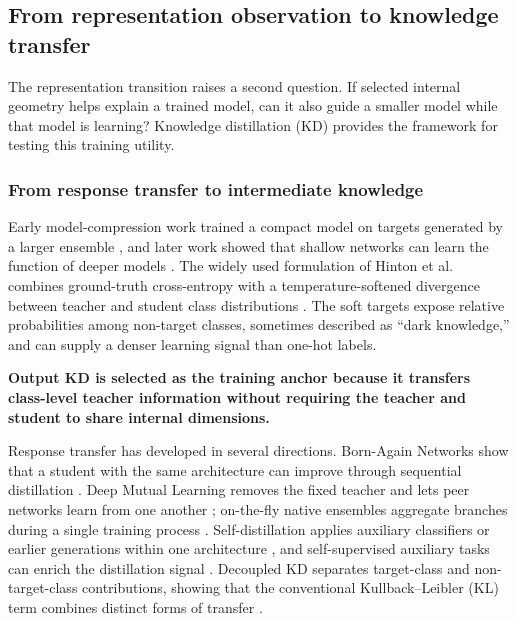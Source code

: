 \subsection{From representation observation to knowledge transfer}

The representation transition raises a second question. If selected internal
geometry helps explain a trained model, can it also guide a smaller model while
that model is learning? Knowledge distillation (KD) provides the framework for
testing this training utility.

\subsubsection{From response transfer to intermediate knowledge}

Early model-compression work trained a compact model on targets
generated by a larger ensemble \cite{bucila2006compression}, and later work
showed that shallow networks can learn the function of deeper models
\cite{ba2014deep}. The widely used formulation of Hinton et al. combines
ground-truth cross-entropy with a temperature-softened divergence between
teacher and student class distributions \cite{hinton2015distilling}. The soft
targets expose relative probabilities among non-target classes, sometimes
described as ``dark knowledge,'' and can supply a denser learning signal than
one-hot labels.

\textbf{Output KD is selected as the training anchor because it transfers
class-level teacher information without requiring the teacher and student to
share internal dimensions.}

Response transfer has developed in several directions. Born-Again Networks
show that a student with the same architecture can improve through sequential
distillation \cite{furlanello2018ban}. Deep Mutual Learning removes the fixed
teacher and lets peer networks learn from one another
\cite{zhang2018dml}; on-the-fly native ensembles aggregate branches during a
single training process \cite{lan2018one}. Self-distillation applies auxiliary
classifiers or earlier generations within one architecture
\cite{zhang2019byot}, and self-supervised auxiliary tasks can enrich the
distillation signal \cite{xu2020sskd}. Decoupled KD separates target-class and
non-target-class contributions, showing that the conventional
Kullback--Leibler (KL) term combines
distinct forms of transfer \cite{zhao2022dkd}.

